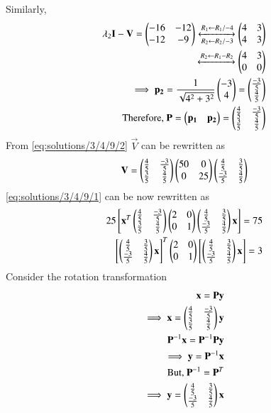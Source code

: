 Similarly,
\begin{align}
  \lambda_2\mathbf{I}-\mathbf{V}= \begin{pmatrix}-16&-12\\-12&-9\end{pmatrix}\xleftrightarrow[R_2\leftarrow R_2/-3]{R_1\leftarrow R_1/-4}\begin{pmatrix}4&3\\4&3\end{pmatrix}\\
\xleftrightarrow[]{R_2\leftarrow R_1-R_2}\begin{pmatrix}4&3\\0&0\end{pmatrix}\\
\implies \mathbf{p_2}=\frac{1}{\sqrt{4^2+3^2}}\begin{pmatrix}-3\\4\end{pmatrix}=\begin{pmatrix}\frac{-3}{5}\\\frac{4}{5}\end{pmatrix}\\\text{ Therefore, } \mathbf{P}=\begin{pmatrix}\mathbf{p_1}&\mathbf{p_2}\end{pmatrix}=\begin{pmatrix}\frac{4}{5}&\frac{-3}{5}\\ \frac{3}{5}&\frac{4}{5}\end{pmatrix}
\end{align}
From \eqref{eq:solutions/3/4/9/2} $\vec{V}$ can be rewritten as
\begin{align}
    \mathbf{V}=\begin{pmatrix}\frac{4}{5}&\frac{-3}{5}\\ \frac{3}{5}&\frac{4}{5}\end{pmatrix}\begin{pmatrix}50&0\\0&25\end{pmatrix}\begin{pmatrix}\frac{4}{5}&\frac{3}{5}\\ \frac{-3}{5}&\frac{4}{5}\end{pmatrix}
\end{align}
\eqref{eq:solutions/3/4/9/1} can be now rewritten as
\begin{align}
25\left[\mathbf{x}^T\begin{pmatrix}\frac{4}{5}&\frac{-3}{5}\\ \frac{3}{5}&\frac{4}{5}\end{pmatrix}\begin{pmatrix}2&0\\0&1\end{pmatrix}\begin{pmatrix}\frac{4}{5}&\frac{3}{5}\\ \frac{-3}{5}&\frac{4}{5}\end{pmatrix}\mathbf{x}\right]=75\\
  \left[\begin{pmatrix}\frac{4}{5}&\frac{3}{5}\\ \frac{-3}{5}&\frac{4}{5}\end{pmatrix}\mathbf{x}\right]^T\begin{pmatrix}2&0\\0&1\end{pmatrix}\left[\begin{pmatrix}\frac{4}{5}&\frac{3}{5}\\ \frac{-3}{5}&\frac{4}{5}\end{pmatrix}\mathbf{x}\right]= 3\label{eq:solutions/3/4/9/3}
\end{align}
 Consider the rotation transformation 
\begin{align}
  \mathbf{x}=\mathbf{P}\mathbf{y}\\
  \implies \mathbf{x}=\begin{pmatrix}\frac{4}{5}&\frac{-3}{5}\\ \frac{3}{5}&\frac{4}{5}\end{pmatrix}\mathbf{y}\label{eq:solutions/3/4/9/4}\\
  \mathbf{P}^{-1}\mathbf{x}=\mathbf{P}^{-1}\mathbf{P}\mathbf{y}\\
  \implies \mathbf{y}= \mathbf{P}^{-1}\mathbf{x}\\
  \text{But, }\mathbf{P}^{-1}=\mathbf{P}^T\\
  \implies \mathbf{y}=\begin{pmatrix}\frac{4}{5}&\frac{3}{5}\\ \frac{-3}{5}&\frac{4}{5}\end{pmatrix}\mathbf{x}
\end{align}

